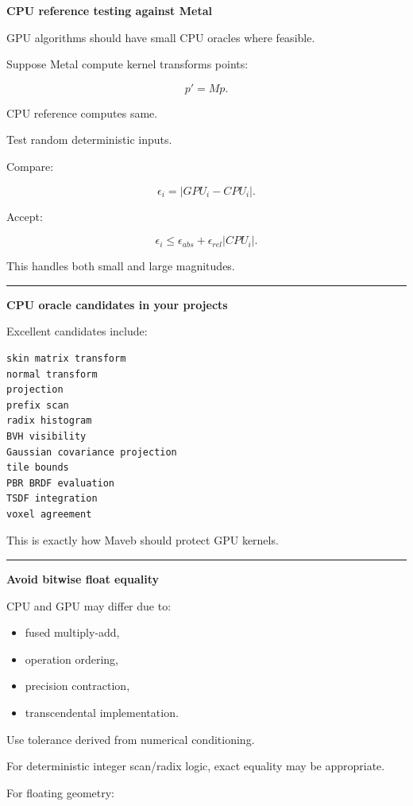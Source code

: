 \textbf{CPU reference testing against Metal}

GPU algorithms should have small CPU oracles where feasible.

Suppose Metal compute kernel transforms points:

\[
p'=Mp.
\]

CPU reference computes same.

Test random deterministic inputs.

Compare:

\[
\epsilon_i=
|GPU_i-CPU_i|.
\]

Accept:

\[
\epsilon_i
\le
\epsilon_{abs}
+
\epsilon_{rel}|CPU_i|.
\]

This handles both small and large magnitudes.

\begin{center}\rule{0.5\linewidth}{0.5pt}\end{center}

\textbf{CPU oracle candidates in your projects}

Excellent candidates include:

\begin{verbatim}
skin matrix transform
normal transform
projection
prefix scan
radix histogram
BVH visibility
Gaussian covariance projection
tile bounds
PBR BRDF evaluation
TSDF integration
voxel agreement
\end{verbatim}

This is exactly how Maveb should protect GPU kernels.

\begin{center}\rule{0.5\linewidth}{0.5pt}\end{center}

\textbf{Avoid bitwise float equality}

CPU and GPU may differ due to:

\begin{itemize}
\tightlist
\item
  fused multiply-add,
\item
  operation ordering,
\item
  precision contraction,
\item
  transcendental implementation.
\end{itemize}

Use tolerance derived from numerical conditioning.

For deterministic integer scan/radix logic, exact equality may be appropriate.

For floating geometry:

